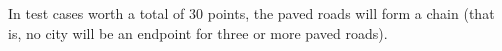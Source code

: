 In test cases worth a total of $30$ points, the paved roads will form a chain (that is, no city will be an endpoint for three or more paved roads).
